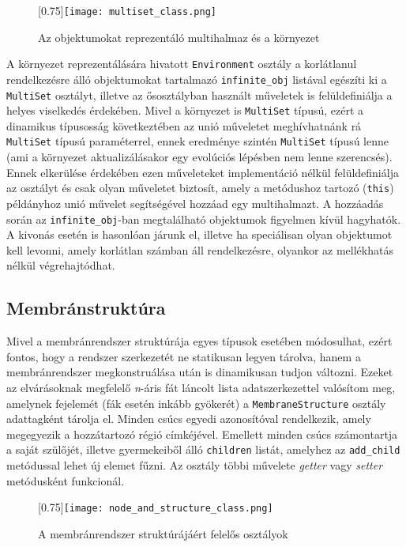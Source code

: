 \begin{figure}[H]
\centering
	\scalebox{0.75}[0.75]{\texttt{[image: multiset\_class.png]}}
	\caption{Az objektumokat reprezentáló multihalmaz és a környezet}
	\label{fig:multiset_uml}
\end{figure}

A környezet reprezentálására hivatott \verb|Environment| osztály a korlátlanul rendelkezésre álló objektumokat tartalmazó \verb|infinite_obj| listával egészíti ki a \verb|MultiSet| osztályt, illetve az ősosztályban használt műveletek is felüldefiniálja a helyes viselkedés érdekében. Mivel a környezet is \verb|MultiSet| típusú, ezért a dinamikus típusosság következtében az unió műveletet meghívhatnánk rá \verb|MultiSet| típusú paraméterrel, ennek eredménye szintén \verb|MultiSet| típusú lenne (ami a környezet aktualizálásakor egy evolúciós lépésben nem lenne szerencsés). Ennek elkerülése érdekében ezen műveleteket implementáció nélkül felüldefiniálja az osztályt és csak olyan műveletet biztosít, amely a metódushoz tartozó (\verb|this|)  példányhoz unió művelet segítségével hozzáad egy multihalmazt. A hozzáadás során az \verb|infinite_obj|-ban megtalálható objektumok figyelmen kívül hagyhatók. A kivonás esetén is hasonlóan járunk el, illetve ha speciálisan olyan objektumot kell levonni, amely korlátlan számban áll rendelkezésre, olyankor az mellékhatás nélkül végrehajtódhat.

\subsection{Membránstruktúra}

Mivel a membránrendszer struktúrája egyes típusok esetében módosulhat, ezért fontos, hogy a rendszer szerkezetét ne statikusan legyen tárolva, hanem a membránrendszer megkonstruálása után is dinamikusan tudjon változni.  Ezeket az elvárásoknak megfelelő \textit{n}-áris fát láncolt lista adatszerkezettel valósítom meg, amelynek fejelemét (fák esetén inkább gyökerét)  a \verb|MembraneStructure| osztály adattagként tárolja el. Minden csúcs egyedi azonosítóval rendelkezik, amely megegyezik a hozzátartozó régió címkéjével. Emellett minden csúcs számontartja a saját szülőjét, illetve gyermekeiből álló \verb|children| listát, amelyhez az \verb|add_child| metódussal lehet új elemet fűzni. Az osztály többi művelete \textit{getter} vagy \textit{setter} metódusként funkcionál.

\begin{figure}[H]
\centering
	\scalebox{0.75}[0.75]{\texttt{[image: node\_and\_structure\_class.png]}}
	\caption{A membránrendszer struktúrájáért felelős osztályok}
	\label{fig:node_and_structure_uml}
\end{figure}


